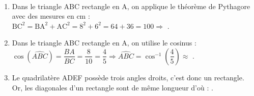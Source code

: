 \ \\ [-5mm]
\begin{enumerate}
   \item Dans le triangle ABC rectangle en A, on applique le théorème de Pythagore avec des mesures en cm : \\
   $\text{BC}^2=\text{BA}^2+\text{AC}^2 =8^2+6^2 =64+36 =100 \Longrightarrow$ .
   \item Dans le triangle ABC rectangle en A, on utilise le cosinus : \\
   $\cos(\widehat{ABC}) =\dfrac{BA}{BC} =\dfrac{8}{10} =\dfrac45 \Longrightarrow \widehat{ABC} =\cos^{-1}\left(\dfrac45\right) \approx$ \bm{37\degre}.
   \item Le quadrilatère ADEF possède trois angles droits, c'est donc un rectangle. Or, les diagonales d'un rectangle sont de même longueur d'où : .
\end{enumerate}
